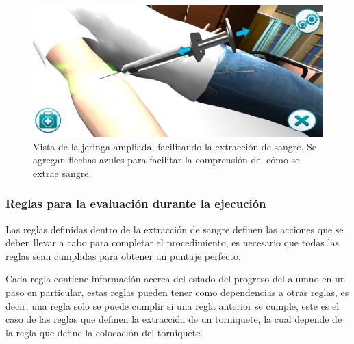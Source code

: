 \begin{figure}
\centering
\includegraphics[scale=0.5]{propuesta/hemocultivo_jeringa_ampliada.jpg}
\caption{Vista de la jeringa ampliada, facilitando la extracción de sangre. Se
    agregan flechas azules para facilitar la comprensión del cómo se extrae
    sangre.}
\label{fig:hemocultivo_jeringa_zoom}
\end{figure}



\subsubsection{Reglas para la evaluación durante la ejecución}



Las reglas definidas dentro de la extracción de sangre definen las acciones
que se deben llevar a cabo para completar el procedimiento, es necesario que
todas las reglas sean cumplidas para obtener un puntaje perfecto.

Cada regla contiene información acerca del estado del progreso del alumno en un
paso en particular, estas reglas pueden tener como dependencias a otras reglas,
es decir, una regla solo se puede cumplir si una regla anterior se cumple, este
es el caso de las reglas que definen la extracción de un torniquete, la cual
depende de la regla que define la colocación del torniquete.  

